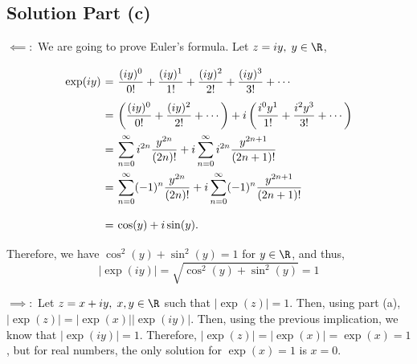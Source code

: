 \subsection*{Solution Part (c)}

$\boldsymbol{\impliedby:}$ We are going to prove Euler's formula. Let $z = iy,\; y\in \R$,
\[ \everymath{\displaystyle}
\arraycolsep=1.8pt\def\arraystretch{2.5}
\begin{array}{rcl}
    \exp(iy) & = & \frac{(iy)^0}{0!} + \frac{(iy)^1}{1!} + \frac{(iy)^2}{2!} + \frac{(iy)^3}{3!} + \cdots\\
    & = & \left( \frac{(iy)^0}{0!} + \frac{(iy)^2}{2!} + \cdots \right) + i\left( \frac{i^0 y^1}{1!} + \frac{i^2 y^3}{3!} + \cdots \right)\\
    & = & \sum_{n = 0}^{\infty} i^{2n}\frac{y^{2n}}{(2n)!} + i \sum_{n = 0}^{\infty} i^{2n}\frac{y^{2n+1}}{(2n+1)!}\\
    & = & \sum_{n = 0}^{\infty} (-1)^{n}\frac{y^{2n}}{(2n)!} + i \sum_{n = 0}^{\infty} (-1)^{n}\frac{y^{2n+1}}{(2n+1)!}\\
    & = & \cos(y) + i \sin(y).
\end{array} \]
Therefore, we have $\cos^2(y) + \sin^2(y) = 1$ for $y\in \R$, and thus,
\[ |\exp(iy)| = \sqrt{\cos^2(y) + \sin^2(y)} = 1 \]

$\boldsymbol{\implies:}$ Let $z = x+iy,\; x,y\in\R$ such that $|\exp(z)| = 1$. Then, using part (a), $|\exp(z)| = |\exp(x)| |\exp(iy)|$. 
Then, using the previous implication, we know that $|\exp(iy)| = 1$. 
Therefore, $|\exp(z)| = |\exp(x)| = \exp(x) = 1$, but for real numbers, the only solution for $\exp(x) = 1$ is $x  = 0$.
